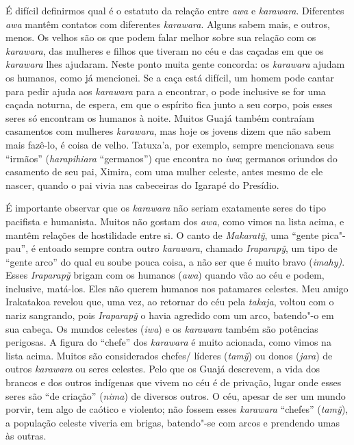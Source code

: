 É difícil definirmos qual é o estatuto da relação entre \emph{awa} e
\emph{karawara}. Diferentes \emph{awa} mantêm contatos com diferentes
\emph{karawara}. Alguns sabem mais, e outros, menos. Os velhos são os
que podem falar melhor sobre sua relação com os \emph{karawara}, das
mulheres e filhos que tiveram no céu e das caçadas em que os
\emph{karawara} lhes ajudaram. Neste ponto muita gente concorda: os
\emph{karawara} ajudam os humanos, como já mencionei. Se a caça está
difícil, um homem pode cantar para pedir ajuda aos \emph{karawara} para
a encontrar, o pode inclusive se for uma caçada noturna, de espera, em
que o espírito fica junto a seu corpo, pois esses seres só encontram os
humanos à noite. Muitos Guajá também contraíam casamentos com mulheres
\emph{karawara}, mas hoje os jovens dizem que não sabem mais fazê-lo, é
coisa de velho. Tatuxa'a, por exemplo, sempre mencionava seus ``irmãos''
(\emph{harapihiara} ``germanos'') que encontra no \emph{iwa}; germanos
oriundos do casamento de seu pai, Ximira, com uma mulher celeste, antes
mesmo de ele nascer, quando o pai vivia nas cabeceiras do Igarapé do
Presídio.

É importante observar que os \emph{karawara} não seriam exatamente seres
do tipo pacifista e humanista. Muitos não gostam dos \emph{awa}, como
vimos na lista acima, e mantêm relações de hostilidade entre si. O canto
de \emph{Makaratỹ}, uma ``gente pica"-pau'', é entoado sempre contra
outro \emph{karawara}, chamado \emph{Iraparapỹ}, um tipo de ``gente
arco'' do qual eu soube pouca coisa, a não ser que é muito bravo
(\emph{imahy)}. Esses \emph{Iraparapỹ} brigam com os humanos
(\emph{awa}) quando vão ao céu e podem, inclusive, matá-los. Eles não
querem humanos nos patamares celestes. Meu amigo Irakatakoa revelou que,
uma vez, ao retornar do céu pela \emph{takaja}, voltou com o nariz
sangrando, pois \emph{Iraparapỹ} o havia agredido com um arco, batendo"-o
em sua cabeça. Os mundos celestes (\emph{iwa}) e os \emph{karawara}
também são potências perigosas. A figura do ``chefe'' dos
\emph{karawara} é muito acionada, como vimos na lista acima. Muitos são
considerados chefes/ líderes (\emph{tamỹ}) ou donos (\emph{jara}) de
outros \emph{karawara} ou seres celestes. Pelo que os Guajá descrevem, a
vida dos brancos e dos outros indígenas que vivem no céu é de privação,
lugar onde esses seres são ``de criação'' (\emph{nima}) de diversos
outros. O céu, apesar de ser um mundo porvir, tem algo de caótico e
violento; não fossem esses \emph{karawara} ``chefes'' (\emph{tamỹ}), a
população celeste viveria em brigas, batendo"-se com arcos e prendendo
umas às outras.

